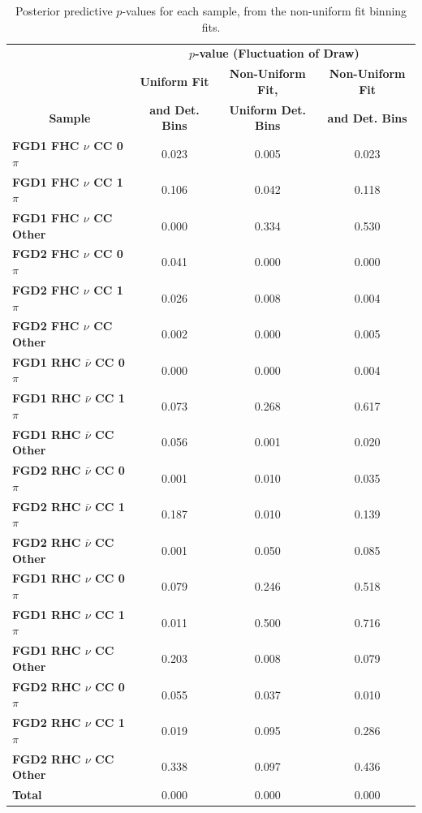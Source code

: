 \begin{center}
\begin{table}[!htbp]
\center
\begin{tabular}{l||c c c}
\hline \hline
& \multicolumn{3}{c}{\textbf{$p$-value (Fluctuation of Draw)}} \\
& \multicolumn{1}{c}{\textbf{Uniform Fit}} & \multicolumn{1}{c}{\textbf{Non-Uniform Fit,}} & \multicolumn{1}{c}{\textbf{Non-Uniform Fit}}\\
\multicolumn{1}{c||}{\textbf{Sample}} & \multicolumn{1}{c}{\textbf{and Det. Bins}} & \multicolumn{1}{c}{\textbf{Uniform Det. Bins}} & \multicolumn{1}{c}{\textbf{and Det. Bins}}\\
\hline \hline
\textbf{FGD1 FHC $\nu$ CC 0$\pi$} & 0.023 & 0.005 & 0.023 \\ 
\textbf{FGD1 FHC $\nu$ CC 1$\pi$} & 0.106 & 0.042 & 0.118 \\
\textbf{FGD1 FHC $\nu$ CC Other} & 0.000 & 0.334 & 0.530 \\ \hline
\textbf{FGD2 FHC $\nu$ CC 0$\pi$} & 0.041 & 0.000 & 0.000 \\
\textbf{FGD2 FHC $\nu$ CC 1$\pi$} & 0.026 & 0.008 & 0.004\\ 
\textbf{FGD2 FHC $\nu$ CC Other} & 0.002 & 0.000 & 0.005\\ \hline
\textbf{FGD1 RHC $\bar{\nu}$ CC 0$\pi$} & 0.000 & 0.000 & 0.004\\
\textbf{FGD1 RHC $\bar{\nu}$ CC 1$\pi$} & 0.073 & 0.268 & 0.617 \\
\textbf{FGD1 RHC $\bar{\nu}$ CC Other} & 0.056 & 0.001 & 0.020 \\ \hline
\textbf{FGD2 RHC $\bar{\nu}$ CC 0$\pi$} & 0.001 & 0.010 & 0.035 \\
\textbf{FGD2 RHC $\bar{\nu}$ CC 1$\pi$} & 0.187 & 0.010 & 0.139\\
\textbf{FGD2 RHC $\bar{\nu}$ CC Other} & 0.001 & 0.050 & 0.085 \\ \hline
\textbf{FGD1 RHC $\nu$ CC 0$\pi$} & 0.079 & 0.246 & 0.518 \\
\textbf{FGD1 RHC $\nu$ CC 1$\pi$} & 0.011 & 0.500 & 0.716\\
\textbf{FGD1 RHC $\nu$ CC Other} & 0.203 & 0.008 & 0.079\\ \hline
\textbf{FGD2 RHC $\nu$ CC 0$\pi$} & 0.055 & 0.037 & 0.010\\
\textbf{FGD2 RHC $\nu$ CC 1$\pi$} & 0.019 & 0.095 & 0.286\\
\textbf{FGD2 RHC $\nu$ CC Other} & 0.338 & 0.097 & 0.436\\ \hline
\textbf{Total} & 0.000 & 0.000 & 0.000 \\ \hline\hline
\end{tabular}
\caption{Posterior predictive $p$-values for each sample, from the non-uniform fit binning fits.}
\label{tab:polypval}
\end{table}
\end{center}
\vspace{-1.0cm}

